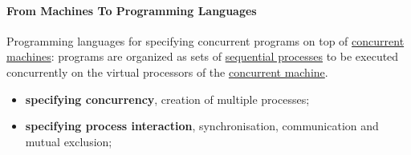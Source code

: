 \paragraph{From Machines To Programming Languages}\label{par:cp_from_machines_to_programming_languages} %
Programming languages for specifying concurrent programs on top of \hyperref[def:conc-machine]{concurrent machines}: programs are organized as sets of \hyperref[def:seq-process]{sequential processes} to be executed concurrently on the virtual processors of the \hyperref[def:conc-machine]{concurrent machine}. 
\begin{note}
    \begin{itemize}
        \item \textbf{specifying concurrency}, creation of multiple processes;
        \item \textbf{specifying process interaction}, synchronisation, communication and mutual exclusion;
    \end{itemize}
\end{note}

